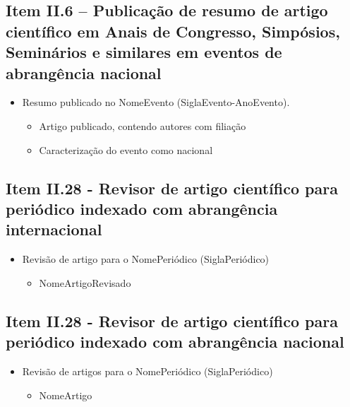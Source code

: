 \subsection{Item II.6 -- Publicação de resumo de artigo científico em Anais de Congresso, Simpósios, Seminários e similares em eventos de abrangência nacional}

\begin{itemize}
    \item Resumo publicado no NomeEvento (SiglaEvento-AnoEvento).
    \begin{itemize}
        \item Artigo publicado, contendo autores com filiação
        
        \item Caracterização do evento como nacional
    \end{itemize}
\end{itemize}


\subsection{Item II.28 - Revisor de artigo científico para periódico indexado com abrangência internacional}

\begin{itemize}
    \item Revisão de artigo para o NomePeriódico (SiglaPeriódico)
    \begin{itemize}
        \item NomeArtigoRevisado
    \end{itemize}
\end{itemize}


\subsection{Item II.28 - Revisor de artigo científico para periódico indexado com abrangência nacional}

\begin{itemize}
    \item Revisão de artigos para o NomePeriódico (SiglaPeriódico)
    \begin{itemize}
        \item NomeArtigo
    \end{itemize}
\end{itemize}
